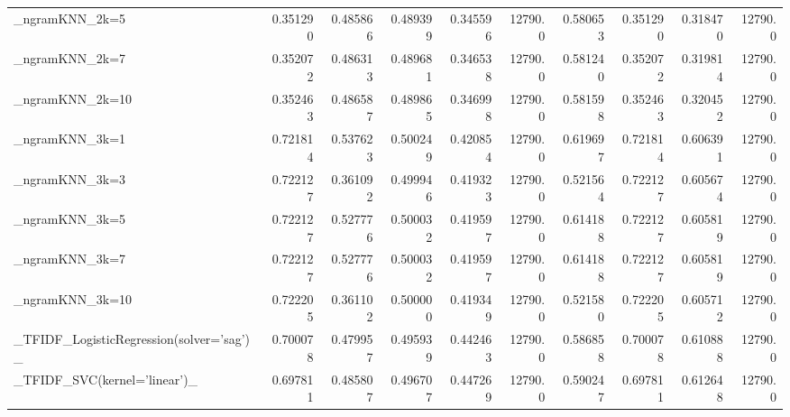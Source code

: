 \begin{tabular}{lrrrrrrrrr}
\_ngramKNN\_2k=5                                     &  0.351290 &         0.485866 &      0.489399 &        0.345596 &        12790.0 &            0.580653 &         0.351290 &           0.318470 &           12790.0 \\
\_ngramKNN\_2k=7                                     &  0.352072 &         0.486313 &      0.489681 &        0.346538 &        12790.0 &            0.581240 &         0.352072 &           0.319814 &           12790.0 \\
\_ngramKNN\_2k=10                                    &  0.352463 &         0.486587 &      0.489865 &        0.346998 &        12790.0 &            0.581598 &         0.352463 &           0.320452 &           12790.0 \\
\_ngramKNN\_3k=1                                     &  0.721814 &         0.537623 &      0.500249 &        0.420854 &        12790.0 &            0.619697 &         0.721814 &           0.606391 &           12790.0 \\
\_ngramKNN\_3k=3                                     &  0.722127 &         0.361092 &      0.499946 &        0.419323 &        12790.0 &            0.521564 &         0.722127 &           0.605674 &           12790.0 \\
\_ngramKNN\_3k=5                                     &  0.722127 &         0.527776 &      0.500032 &        0.419597 &        12790.0 &            0.614188 &         0.722127 &           0.605819 &           12790.0 \\
\_ngramKNN\_3k=7                                     &  0.722127 &         0.527776 &      0.500032 &        0.419597 &        12790.0 &            0.614188 &         0.722127 &           0.605819 &           12790.0 \\
\_ngramKNN\_3k=10                                    &  0.722205 &         0.361102 &      0.500000 &        0.419349 &        12790.0 &            0.521580 &         0.722205 &           0.605712 &           12790.0 \\
\_TFIDF\_LogisticRegression(solver='sag')\_           &  0.700078 &         0.479957 &      0.495939 &        0.442463 &        12790.0 &            0.586858 &         0.700078 &           0.610888 &           12790.0 \\
\_TFIDF\_SVC(kernel='linear')\_                       &  0.697811 &         0.485807 &      0.496707 &        0.447269 &        12790.0 &            0.590247 &         0.697811 &           0.612648 &           12790.0 \\

\end{tabular}
